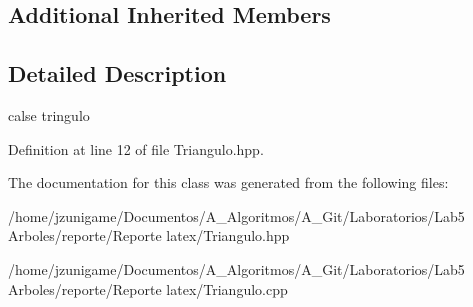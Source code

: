 \subsection*{Additional Inherited Members}


\subsection{Detailed Description}
calse tringulo 

Definition at line 12 of file Triangulo.\+hpp.



The documentation for this class was generated from the following files\+:\begin{DoxyCompactItemize}
\item 
/home/jzunigame/\+Documentos/\+A\+\_\+\+Algoritmos/\+A\+\_\+\+Git/\+Laboratorios/\+Lab5 Arboles/reporte/\+Reporte latex/Triangulo.\+hpp\item 
/home/jzunigame/\+Documentos/\+A\+\_\+\+Algoritmos/\+A\+\_\+\+Git/\+Laboratorios/\+Lab5 Arboles/reporte/\+Reporte latex/Triangulo.\+cpp\end{DoxyCompactItemize}

